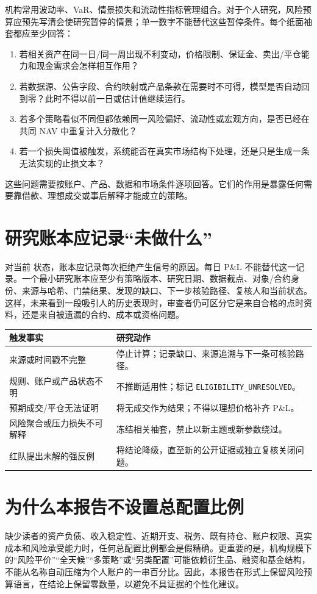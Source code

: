 机构常用波动率、VaR、情景损失和流动性指标管理组合。对于个人研究，风险预算应预先写清会使研究暂停的情景；单一数字不能替代这些暂停条件。每个纸面袖套都应至少回答：

\begin{enumerate}
  \item 若相关资产在同一日/同一周出现不利变动，价格限制、保证金、卖出/平仓能力和现金需求会怎样相互作用？
  \item 若数据源、公告字段、合约映射或产品条款在需要时不可得，模型是否自动回到零？此时不得以前一日或估计值继续运行。
  \item 若多个策略看似不同但都依赖同一风险偏好、流动性或宏观方向，是否已经在共同 NAV 中重复计入分散化？
  \item 若一个损失阈值被触发，系统能否在真实市场结构下处理，还是只是生成一条无法实现的止损文本？
\end{enumerate}

这些问题需要按账户、产品、数据和市场条件逐项回答。它们的作用是暴露任何需要靠借款、理想成交或事后解释才能成立的策略。

\section{研究账本应记录“未做什么”}

对当前 \qzero{} 状态，账本应记录每次拒绝产生信号的原因。每日 P\&L 不能替代这一记录。一个最小研究账本应至少有策略版本、研究日期、数据截点、对象/合约身份、来源与哈希、门禁结果、发现的缺口、下一步核验路径、复核人和当前状态。这样，未来看到一段吸引人的历史表现时，审查者仍可区分它是来自合格的点时资料，还是来自被遗漏的合约、成本或资格问题。

\begin{dashboardbox}[冻结优先级]
\begin{tabularx}{\textwidth}{L{3.0cm}X}
\toprule
\textbf{触发事实} & \textbf{研究动作} \\
\midrule
来源或时间戳不完整 & 停止计算；记录缺口、来源追溯与下一条可核验路径。 \\
规则、账户或产品状态不明 & 不推断适用性；标记 \texttt{ELIGIBILITY\_UNRESOLVED}。 \\
预期成交/平仓无法证明 & 将无成交作为结果；不得以理想价格补齐 P\&L。 \\
风险聚合或压力损失不可解释 & 冻结相关袖套，禁止以新主题或新参数绕过。 \\
红队提出未解的强反例 & 将结论降级，直至新的公开证据或独立复核关闭问题。 \\
\bottomrule
\end{tabularx}
\end{dashboardbox}

\section{为什么本报告不设置总配置比例}

缺少读者的资产负债、收入稳定性、近期开支、税务、既有持仓、账户权限、真实成本和风险承受能力时，任何总配置比例都会是假精确。更重要的是，机构规模下的“风险平价”“全天候”“多策略”或“另类配置”可能依赖衍生品、融资和基金结构，不能从名称自动压缩为个人账户的一串百分比。因此，本报告在形式上保留风险预算语言，在结论上保留零数量，以避免不具证据的个性化建议。
